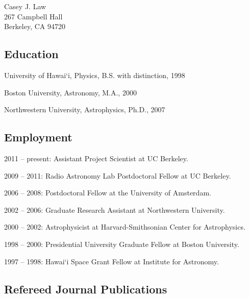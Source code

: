 \documentclass[11pt]{article}
\begin{document}
\thispagestyle{empty}

\begin{center}
  \Large{Casey J. Law \\
    267 Campbell Hall \\
  Berkeley, CA 94720}
\end{center}

\subsection*{Education}
\indent 

University of Hawai`i, Physics, B.S. with distinction, 1998

Boston University, Astronomy, M.A., 2000

Northwestern University, Astrophysics, Ph.D., 2007

\subsection*{Employment}
\indent

2011 -- present:  Assistant Project Scientist at UC Berkeley.

2009 -- 2011:  Radio Astronomy Lab Postdoctoral Fellow at UC Berkeley.

2006 -- 2008:  Postdoctoral Fellow at the University of Amsterdam.

2002 -- 2006:  Graduate Research Assistant at Northwestern University.

2000 -- 2002:  Astrophysicist at Harvard-Smithsonian Center for Astrophysics.

1998 -- 2000:  Presidential University Graduate Fellow at Boston University.

1997 -- 1998:  Hawai`i Space Grant Fellow at Institute for Astronomy.

\subsection*{Refereed Journal Publications}
\indent
\end{document}
